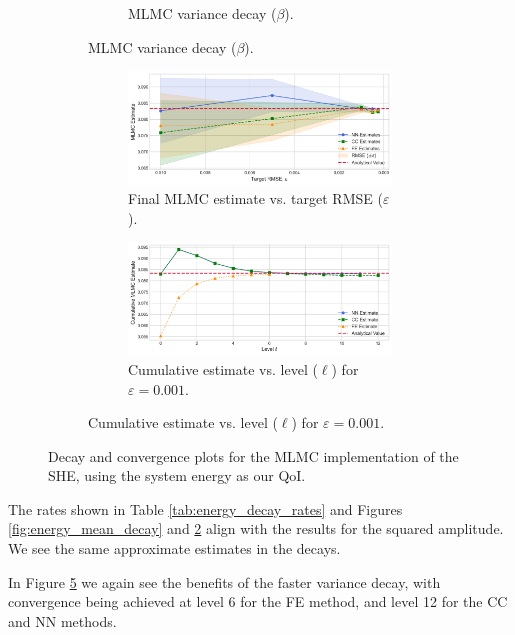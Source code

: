 \begin{figure}[htbp]
\begin{subfigure}{\textwidth}
\begin{subfigure}[b]{0.48\textwidth}
            \caption{MLMC variance decay ($\beta$).}
            \label{fig:energy_variance_decay}
        \end{subfigure}
    \end{subfigure}
    \vspace{1cm}
    \begin{subfigure}{\textwidth}
        \centering
        \begin{subfigure}[b]{\textwidth}
            \centering
            \includegraphics[width=0.7\linewidth]{graphics/she_energy_conv.png}
            \caption{Final MLMC estimate vs. target RMSE ($\varepsilon$).}
            \label{fig:energy_conv_vs_eps}
        \end{subfigure}
        \vspace{0.5cm}
        \begin{subfigure}[b]{\textwidth}
            \centering
            \includegraphics[width=0.7\linewidth]{graphics/she_energy_cumconv.png}
            \caption{Cumulative estimate vs. level ($\ell$) for $\varepsilon=0.001$.}
            \label{fig:energy_cumulative_conv}
        \end{subfigure}
    \end{subfigure}
    \caption{Decay and convergence plots for the MLMC implementation of the SHE, using the system energy as our QoI.}
    \label{fig:she_validation_combined}
\end{figure}

The rates shown in Table \ref{tab:energy_decay_rates} and Figures 
\ref{fig:energy_mean_decay} and \ref{fig:energy_variance_decay} align with the results for the 
squared amplitude. We see the same approximate estimates in the decays. 

In Figure \ref{fig:energy_cumulative_conv} we again see the benefits of the faster 
variance decay, with convergence being achieved at level 6 for the FE method, 
and level 12 for the CC and NN methods.


